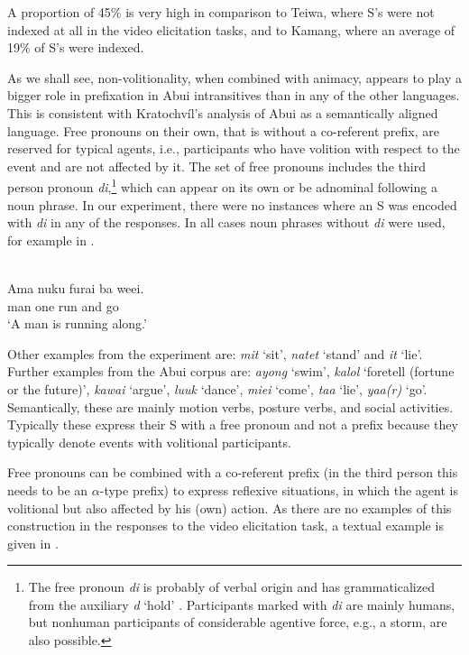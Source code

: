 A proportion of 45\% is very high in comparison to Teiwa, where S's were not indexed at all in the video elicitation tasks, and to Kamang, where an average of 19\% of S's were indexed.

As we shall see, non-volitionality, when combined with animacy, appears to play a bigger role in prefixation in Abui intransitives than in any of the other languages. This is consistent with Kratochv\'il's analysis of Abui as a semantically aligned language. Free pronouns on their own, that is without a co-referent prefix, are reserved for typical agents, i.e., participants who have volition with respect to the event and are not affected by it. The set of free pronouns includes the third person pronoun \textit{di},\footnote{The free pronoun \textit{di} is probably of verbal origin and has grammaticalized from the auxiliary \textit{d} `hold' \citep{Kratochvil2011transitivity}. Participants marked with \textit{di} are mainly humans, but nonhuman participants of considerable agentive force, e.g., a storm, are also possible.} which can appear on its own or be adnominal following a noun phrase. In our experiment, there were no instances where an S was encoded with \textit{di} in any of the responses. In all cases noun phrases without \textit{di} were used, for example in .


\ea%
\label{bkm:Ref283206980}
 \\ 
\gll    Ama  nuku  furai  ba  weei.\\  
      man  one  run  and  go\\
\glt  `A man is running along.' 
\z







Other examples from the experiment are: \textit{mit} `sit', \textit{natet} `stand' and \textit{it} `lie'. Further examples from the Abui corpus are: \textit{ayong} `swim', \textit{kalol} `foretell (fortune or the future)', \textit{kawai} `argue', \textit{luuk} `dance', \textit{miei} `come', \textit{taa} `lie', \textit{yaa(r)} `go'. Semantically, these are mainly motion verbs, posture verbs, and social activities. Typically these express their S with a free pronoun and not a prefix because they typically denote events with volitional participants. 

Free pronouns can be combined with a co-referent prefix (in the third person this needs to be an $\alpha $-type prefix) to express reflexive situations, in which the agent is volitional but also affected by his (own) action. As there are no examples of this construction in the responses to the video elicitation task, a textual example is given in .


